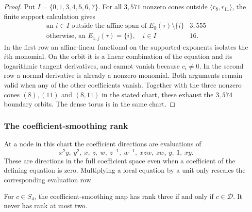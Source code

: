 \begin{proof}
Put $I=\{0,1,3,4,5,6,7\}$. For all $3,571$ nonzero cones outside
$\langle r_8,r_{11}\rangle$, the finite support calculation gives
\[
\begin{array}{l|r}
\text{an }i\in I\text{ outside the affine span of }
                  E_0(\tau)\setminus\{i\}&3,555\\
\text{otherwise, an }E_{1,j}(\tau)=\{i\},\quad i\in I&16.
\end{array}
\]
In the first row an affine-linear functional on the supported exponents
isolates the $i$th monomial. On the orbit it is a linear combination of
the equation and its logarithmic tangent derivatives, and cannot vanish
because $c_i\ne0$. In the second row a normal derivative is already a
nonzero monomial. Both arguments remain valid when any of the other
coefficients vanish. Together with the three nonzero cones $(8),(11)$
and $(8,11)$ in the stated chart, these exhaust the $3,574$ boundary
orbits. The dense torus is in the same chart.
\end{proof}

\subsubsection*{The coefficient-smoothing rank}

At a node in this chart the coefficient directions are evaluations of
\begin{equation}\label{eq:x9evalfunctions}
 x^2y,\ y^2,\ x,\ z,\ w,\ z^{-1},\ w^{-1},\ xzw,\ zw,\ y,\ 1,\ xy.
\end{equation}
These are directions in the full coefficient space even when a
coefficient of the defining equation is zero. Multiplying a local
equation by a unit only rescales the corresponding evaluation row.

\begin{lemma}\label{lem:x9rankglobal}
For $c\in S_4$, the coefficient-smoothing map has rank three if and
only if $c\in\mathcal D$. It never has rank at most two.
\end{lemma}


